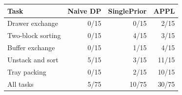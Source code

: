 \begin{tabular}{lrrr}
\hline
Task & Naive DP & SinglePrior & APPL \\
\hline
Drawer exchange & 0/15 & 0/15 & 2/15 \\
Two-block sorting & 0/15 & 4/15 & 3/15 \\
Buffer exchange & 0/15 & 1/15 & 4/15 \\
Unstack and sort & 5/15 & 3/15 & 11/15 \\
Tray packing & 0/15 & 2/15 & 10/15 \\
All tasks & 5/75 & 10/75 & 30/75 \\
\hline
\end{tabular}
